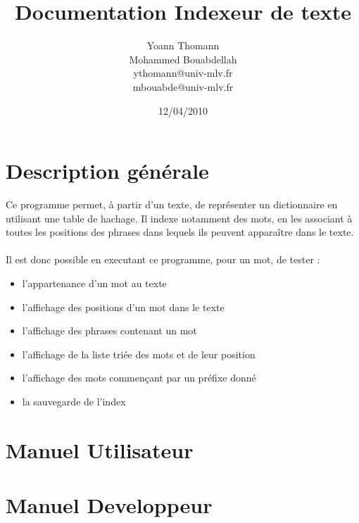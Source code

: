\documentclass[french, 12pt, titlepage]{article}
\author{Yoann Thomann\\Mohammed Bouabdellah\\\scriptsize ythomann@univ-mlv.fr\\\scriptsize mbouabde@univ-mlv.fr}
\date{12/04/2010}
\title{\Huge Documentation Indexeur de texte}
\begin{document}
\vspace{\fill}
\maketitle
\newpage
\tableofcontents
\newpage
\section{Description générale}
Ce programme permet, à partir d'un texte, de représenter un dictionnaire en utilisant une table de hachage. Il indexe notamment des mots, en les associant 
à toutes les positions des phrases dans lequels ils peuvent apparaître dans le texte. \\\\
Il est donc possible en executant ce programme, pour un mot, de tester :
\begin{itemize}
\renewcommand{\labelitemi}{$\bullet$}
\item l'appartenance d'un mot au texte
\item l'affichage des positions d'un mot dans le texte
\item l'affichage des phrases contenant un mot
\item l'affichage de la liste triée des mots et de leur position
\item l'affichage des mots commençant par un préfixe donné
\item la sauvegarde de l'index
\end{itemize}

\section{Manuel Utilisateur}


\section{Manuel Developpeur}
\end{document}
